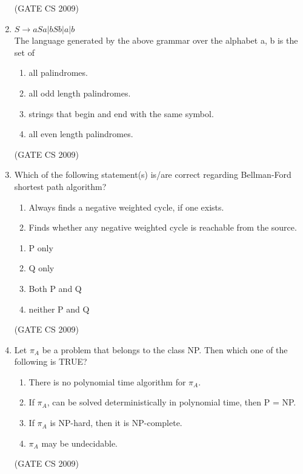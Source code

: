 \documentclass[a4paper, 11pt]{article}
\begin{document}
\begin{enumerate}
    \hfill (GATE CS 2009)

    \item $S \rightarrow aSa | bSb| a | b$\\The language generated by the above grammar over the alphabet {a, b} is the set of
    \begin{enumerate} 
        \item all palindromes.
        \item all odd length palindromes.
        \item strings that begin and end with the same symbol.
        \item all even length palindromes.
    \end{enumerate}

    \hfill (GATE CS 2009)

    \item Which of the following statement(s) is/are correct regarding Bellman-Ford shortest path algorithm?
    \begin{enumerate}[label= \Alph*, start=16]
        \item Always finds a negative weighted cycle, if one exists.
        \item Finds whether any negative weighted cycle is reachable from the source.
    \end{enumerate}
    \begin{enumerate} 
        \item P only
        \item Q only
        \item Both P and Q
        \item neither P and Q
    \end{enumerate}

    \hfill (GATE CS 2009)

    \item Let $\pi_A$ be a problem that belongs to the class NP. Then which one of the following is TRUE?
    \begin{enumerate}
        \item There is no polynomial time algorithm for $\pi_A$.
        \item If $\pi_A$, can be solved deterministically in polynomial time, then P = NP.
        \item If $\pi_A$ is NP-hard, then it is NP-complete.
        \item $\pi_A$ may be undecidable.
    \end{enumerate}

    \hfill (GATE CS 2009)


\end{enumerate}
\end{document}
